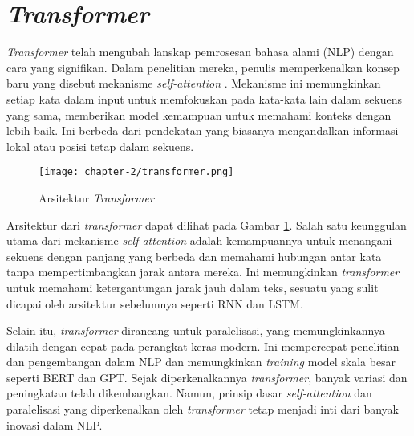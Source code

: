 \section{\textit{Transformer}}

\textit{Transformer} telah mengubah lanskap pemrosesan bahasa alami (NLP) dengan cara yang signifikan. Dalam penelitian mereka, penulis memperkenalkan konsep baru yang disebut mekanisme \textit{self-attention} \parencite{transformers}. Mekanisme ini memungkinkan setiap kata dalam input untuk memfokuskan pada kata-kata lain dalam sekuens yang sama, memberikan model kemampuan untuk memahami konteks dengan lebih baik. Ini berbeda dari pendekatan yang biasanya mengandalkan informasi lokal atau posisi tetap dalam sekuens.

\begin{figure}[ht]
    \centering
    \texttt{[image: chapter-2/transformer.png]}
    \caption{Arsitektur \textit{Transformer} \parencite{transformers}}
    \label{fig:transformer}
\end{figure}

Arsitektur dari \textit{transformer} dapat dilihat pada Gambar \ref{fig:transformer}. Salah satu keunggulan utama dari mekanisme \textit{self-attention} adalah kemampuannya untuk menangani sekuens dengan panjang yang berbeda dan memahami hubungan antar kata tanpa mempertimbangkan jarak antara mereka. Ini memungkinkan \textit{transformer} untuk memahami ketergantungan jarak jauh dalam teks, sesuatu yang sulit dicapai oleh arsitektur sebelumnya seperti RNN dan LSTM.

Selain itu, \textit{transformer} dirancang untuk paralelisasi, yang memungkinkannya dilatih dengan cepat pada perangkat keras modern. Ini mempercepat penelitian dan pengembangan dalam NLP dan memungkinkan \textit{training} model skala besar seperti BERT dan GPT. Sejak diperkenalkannya \textit{transformer}, banyak variasi dan peningkatan telah dikembangkan. Namun, prinsip dasar \textit{self-attention} dan paralelisasi yang diperkenalkan oleh \textit{transformer} tetap menjadi inti dari banyak inovasi dalam NLP.
